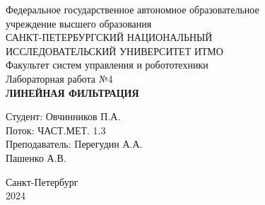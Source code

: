 \documentclass[a4paper]{article}
\begin{document}
\begin{titlepage}
    \begin{center}
        Федеральное государственное автономное образовательное \\ учреждение высшего образования \\[6pt]
        САНКТ-ПЕТЕРБУРГСКИЙ НАЦИОНАЛЬНЫЙ \\ ИССЛЕДОВАТЕЛЬСКИЙ УНИВЕРСИТЕТ ИТМО \\[16pt]
        Факультет систем управления и робототехники \\[26em]
        Лабораторная работа №4 \\[0.5em]
        \textbf{\MakeUppercase{Линейная фильтрация}}
    \end{center}\vspace{12em}
    \begin{flushright}
        Студент: Овчинников П.А.\\
        Поток: ЧАСТ.МЕТ. 1.3 \\[0.5em]
        Преподаватель: Перегудин А.А. \\
        Пашенко А.В.
    \end{flushright}\vspace{8em}
    \begin{center}
        {\small Санкт-Петербург \\ 2024}
    \end{center}
\end{titlepage}
\setcounter{page}{2}
\tableofcontents\newpage
\end{document}
